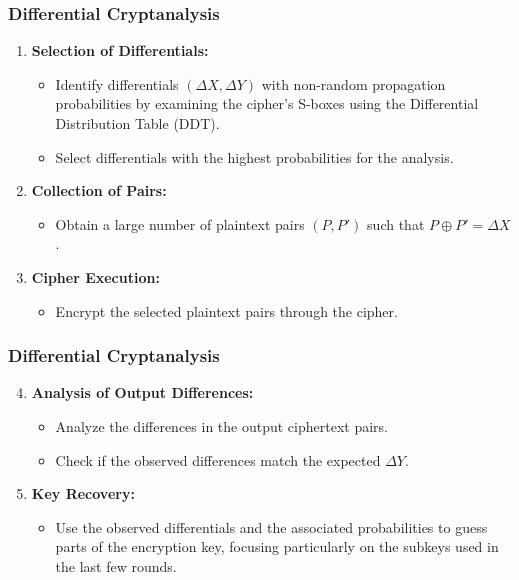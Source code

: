 \documentclass{beamer}
\begin{document}
\begin{frame}
\frametitle{Differential Cryptanalysis}

    \begin{enumerate}
    \item \textbf{Selection of Differentials:}
    \begin{itemize}
        \item Identify differentials $(\Delta X, \Delta Y)$ with non-random propagation probabilities by examining the cipher's S-boxes using the Differential Distribution Table (DDT).
        \item Select differentials with the highest probabilities for the analysis.
    \end{itemize}

    \item \textbf{Collection of Pairs:}
    \begin{itemize}
        \item Obtain a large number of plaintext pairs $(P, P')$ such that $P \oplus P' = \Delta X$.
    \end{itemize}

    \item \textbf{Cipher Execution:}
    \begin{itemize}
        \item Encrypt the selected plaintext pairs through the cipher.
    \end{itemize}

\end{enumerate}
    
\end{frame}
\begin{frame}
\frametitle{Differential Cryptanalysis}

    \begin{enumerate}
    \setcounter{enumi}{3} %
    \item\textbf{Analysis of Output Differences:}
    \begin{itemize}
        \item Analyze the differences in the output ciphertext pairs.
        \item Check if the observed differences match the expected $\Delta Y$.
    \end{itemize}

    \item \textbf{Key Recovery:}
    \begin{itemize}
        \item Use the observed differentials and the associated probabilities to guess parts of the encryption key, focusing particularly on the subkeys used in the last few rounds.
    \end{itemize}
    \end{enumerate}
    
\end{frame}
\end{document}
